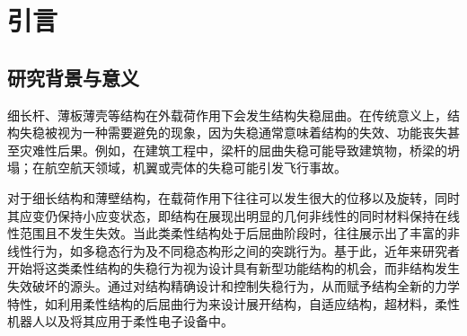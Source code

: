 
\chapter{引\quad 言}
\section{研究背景与意义}
细长杆、薄板薄壳等结构在外载荷作用下会发生结构失稳屈曲\cite{BAZANT200055,bazant2010stability}。在传统意义上，结构失稳被视为一种需要避免的现象，因为失稳通常意味着结构的失效、功能丧失甚至灾难性后果。例如，在建筑工程中，梁杆的屈曲失稳可能导致建筑物，桥梁的坍塌；在航空航天领域，机翼或壳体的失稳可能引发飞行事故。

对于细长结构和薄壁结构，在载荷作用下往往可以发生很大的位移以及旋转，同时其应变仍保持小应变状态，即结构在展现出明显的几何非线性的同时材料保持在线性范围且不发生失效。当此类柔性结构处于后屈曲阶段时，往往展示出了丰富的非线性行为，如多稳态行为及不同稳态构形之间的突跳行为。基于此，近年来研究者开始将这类柔性结构的失稳行为视为设计具有新型功能结构的机会，而非结构发生失效破坏的源头\cite{10.1115/1.4031456}。通过对结构精确设计和控制失稳行为，从而赋予结构全新的力学特性，如利用柔性结构的后屈曲行为来设计展开结构，自适应结构，超材料，柔性机器人以及将其应用于柔性电子设备中。

